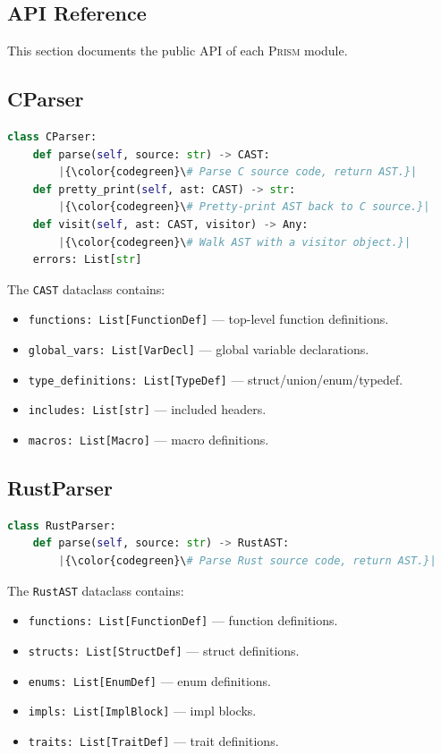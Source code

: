 \documentclass[11pt,a4paper]{article}
\begin{document}
\begin{appendices}
\section{API Reference}\label{app:api}

This section documents the public API of each \textsc{Prism} module.

\subsection{CParser}

\begin{lstlisting}[language=Python,escapechar=|]
class CParser:
    def parse(self, source: str) -> CAST:
        |{\color{codegreen}\# Parse C source code, return AST.}|
    def pretty_print(self, ast: CAST) -> str:
        |{\color{codegreen}\# Pretty-print AST back to C source.}|
    def visit(self, ast: CAST, visitor) -> Any:
        |{\color{codegreen}\# Walk AST with a visitor object.}|
    errors: List[str]
\end{lstlisting}

The \texttt{CAST} dataclass contains:
\begin{itemize}
  \item \texttt{functions: List[FunctionDef]} --- top-level function definitions.
  \item \texttt{global\_vars: List[VarDecl]} --- global variable declarations.
  \item \texttt{type\_definitions: List[TypeDef]} --- struct/union/enum/typedef.
  \item \texttt{includes: List[str]} --- included headers.
  \item \texttt{macros: List[Macro]} --- macro definitions.
\end{itemize}

\subsection{RustParser}

\begin{lstlisting}[language=Python,escapechar=|]
class RustParser:
    def parse(self, source: str) -> RustAST:
        |{\color{codegreen}\# Parse Rust source code, return AST.}|
\end{lstlisting}

The \texttt{RustAST} dataclass contains:
\begin{itemize}
  \item \texttt{functions: List[FunctionDef]} --- function definitions.
  \item \texttt{structs: List[StructDef]} --- struct definitions.
  \item \texttt{enums: List[EnumDef]} --- enum definitions.
  \item \texttt{impls: List[ImplBlock]} --- impl blocks.
  \item \texttt{traits: List[TraitDef]} --- trait definitions.
\end{itemize}


\end{appendices}
\end{document}
